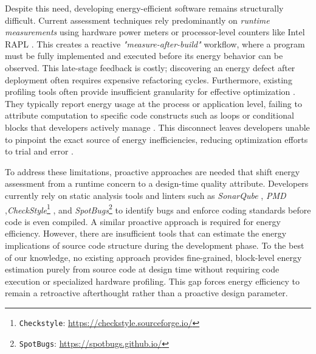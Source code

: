 Despite this need, developing energy-efficient software remains structurally difficult. Current assessment techniques rely predominantly on \textit{runtime measurements} using hardware power meters or processor-level counters like Intel RAPL \cite{10.1145/2425248.2425252}. This creates a reactive \textit{"measure-after-build"} workflow, where a program must be fully implemented and executed before its energy behavior can be observed. This late-stage feedback is costly; discovering an energy defect after deployment often requires expensive refactoring cycles. Furthermore, existing profiling tools often provide insufficient granularity for effective optimization \cite{7429297}. They typically report energy usage at the process or application level, failing to attribute computation to specific code constructs such as loops or conditional blocks that developers actively manage \cite{Khan2018RAPLinAction, Shivadharshan2024CPPJoules}. This disconnect leaves developers unable to pinpoint the exact source of energy inefficiencies, reducing optimization efforts to trial and error \cite{Pinto2017}. 

To address these limitations, proactive approaches are needed that shift energy assessment from a runtime concern to a design-time quality attribute. Developers currently rely on static analysis tools and linters such as \textit{SonarQube} \cite{Lenarduzzi2020JSS}, \textit{PMD} \cite{AlOmar2023SEET_PMD},\textit{CheckStyle}\footnote{\texttt{Checkstyle}: \url{https://checkstyle.sourceforge.io/}}
, and \textit{SpotBugs}\footnote{\texttt{SpotBugs}: \url{https://spotbugs.github.io/}} to identify bugs and enforce coding standards before code is even compiled. A similar proactive approach is required for energy efficiency. However, there are insufficient tools that can estimate the energy implications of source code structure during the development phase. To the best of our knowledge, no existing approach provides fine-grained, block-level energy estimation purely from source code at design time without requiring code execution or specialized hardware profiling.  This gap forces energy efficiency to remain a retroactive afterthought rather than a proactive design parameter. 

